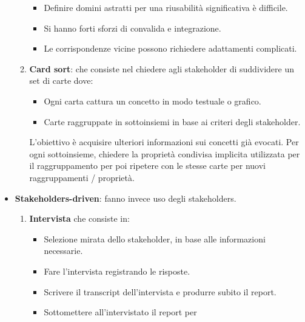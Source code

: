 \begin{itemize}
\begin{enumerate}
\begin{itemize}
                              \item Definire domini astratti per una riusabilità
                                    significativa è difficile.
                              \item Si hanno forti sforzi di convalida e integrazione.
                              \item Le corrispondenze vicine possono richiedere
                                    adattamenti complicati.
                        \end{itemize}
                  \item \textbf{Card sort}: che consiste nel chiedere agli
                        stakeholder di suddividere un set di carte dove:
                        \begin{itemize}
                              \item Ogni carta cattura un concetto in modo testuale
                                    o grafico.
                              \item Carte raggruppate in sottoinsiemi in base ai
                                    criteri degli stakeholder.
                        \end{itemize}
                        L'obiettivo è acquisire ulteriori informazioni sui
                        concetti già evocati. Per ogni sottoinsieme, chiedere la
                        proprietà condivisa implicita utilizzata per il
                        raggruppamento per poi ripetere con le stesse carte per
                        nuovi raggruppamenti / proprietà.
            \end{enumerate}
      \item \textbf{Stakeholders-driven}: fanno invece uso degli stakeholders.
            \begin{enumerate}
                  \item \textbf{Intervista} che consiste in:
                        \begin{itemize}
                              \item Selezione mirata dello stakeholder, in base
                                    alle informazioni necessarie.
                              \item Fare l'intervista registrando le risposte.
                              \item Scrivere il transcript dell'intervista e
                                    produrre subito il report.
                              \item Sottomettere all'intervistato il report per

\end{itemize}
\end{enumerate}
\end{itemize}
